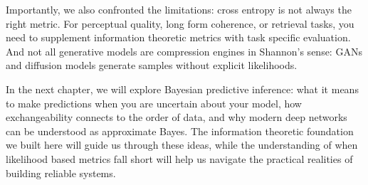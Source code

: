 Importantly, we also confronted the limitations: cross entropy is not always the right metric. For perceptual quality, long form coherence, or retrieval tasks, you need to supplement information theoretic metrics with task specific evaluation. And not all generative models are compression engines in Shannon's sense: GANs and diffusion models generate samples without explicit likelihoods.

In the next chapter, we will explore Bayesian predictive inference: what it means to make predictions when you are uncertain about your model, how exchangeability connects to the order of data, and why modern deep networks can be understood as approximate Bayes. The information theoretic foundation we built here will guide us through these ideas, while the understanding of when likelihood based metrics fall short will help us navigate the practical realities of building reliable systems.